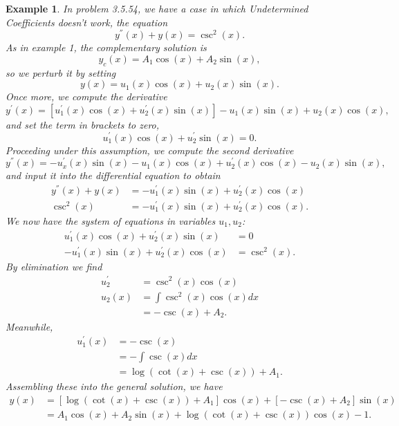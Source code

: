 \documentclass[11pt]{amsart}
\newtheorem{example}{Example}
\numberwithin{equation}{section}
\begin{document}
\begin{example}
In problem 3.5.54, we have a case in which Undetermined Coefficients doesn't work, the equation
\begin{equation*}
y^{''}(x)+y(x) = \csc^2(x).
\end{equation*}
As in example 1, the complementary solution is 
\begin{equation*}
y_c(x)=A_1\cos(x)+A_2\sin(x),
\end{equation*}
so we perturb it by setting 
\begin{equation*}
y(x)=u_1(x)\cos(x)+u_2(x)\sin(x).
\end{equation*}
Once more, we compute the derivative
\begin{equation*}
y^{'}(x)=[u_{1}^{'}(x)\cos(x)+u_{2}^{'}(x)\sin(x)] -u_1(x)\sin(x)+u_2(x)\cos(x),
\end{equation*}
and set the term in brackets to zero, 
\begin{equation}\label{example3_step1}
u_{1}^{'}(x)\cos(x)+u_{2}^{'}\sin(x)=0.
\end{equation}
Proceeding under this assumption, we compute the second derivative
\begin{equation*}
y^{''}(x) = -u_{x}^{'}(x)\sin(x)-u_1(x)\cos(x)+u_{2}^{'}(x)\cos(x)-u_2(x)\sin(x),
\end{equation*}
and input it into the differential equation to obtain
\begin{align}
\nonumber
y^{''}(x)+y(x) & =-u_{1}^{'}(x)\sin(x)+u_{2}^{'}(x)\cos(x) \\
\label{example3_step2}
\csc^2(x) & = -u_{1}^{'}(x)\sin(x)+u_{2}^{'}(x)\cos(x) .
\end{align}
We now have the system of equations in variables $u_1,u_2$:
\begin{align*}
u_{1}^{'}(x)\cos(x)+u_{2}^{'}(x)\sin(x) & =0\\
-u_{1}^{'}(x)\sin(x)+u_{2}^{'}(x)\cos(x) & = \csc^2(x).
\end{align*}
By elimination we find 
\begin{align*}
u_{2}^{'} & = \csc^2(x)\cos(x) \\
u_2(x) & = \int \csc^2(x)\cos(x) dx \\
& = -\csc(x)+A_2.
\end{align*}
Meanwhile, 
\begin{align*}
u_{1}^{'}(x) & = -\csc(x) \\
& = -\int \csc(x) dx \\
& = \log(\cot(x)+\csc(x))+A_1.
\end{align*}
Assembling these into the general solution, we have 
\begin{align*}
y(x) & = \left[\log(\cot(x)+\csc(x))+A_1\right]\cos(x) + \left[-\csc(x)+A_2\right]\sin(x)\\
& = A_1\cos(x) + A_2\sin(x) + \log(\cot(x)+\csc(x))\cos(x)-1.
\end{align*}
\end{example}
\end{document}
